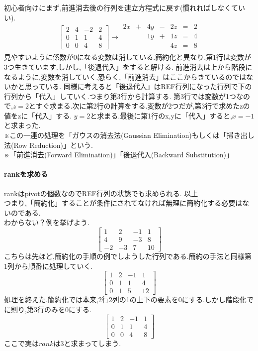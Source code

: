 初心者向けにまず,前進消去後の行列を連立方程式に戻す(慣れればしなくていい).
\[
\begin{bmatrix}
    2& 4 & -2 & 2 \\
    0 & 1 & 1 & 4 \\
    0 & 0 & 4 & 8
\end{bmatrix}
\rightarrow
\begin{array}{ccccccc}
    2x & + &4y & -&2z &= &2 \\
       &  &1y & +&1z &= &4 \\
       &  &   &  &4z &= &8 \\
\end{array}
\]
見やすいように係数が0になる変数は消している.簡約化と異なり,第1行は変数が3つ生きています.しかし,「後退代入」をすると解ける.
前進消去は上から階段になるように,変数を消していく.恐らく,「前進消去」はここからきているのではないかと思っている.
同様に考えると「後退代入」はREF行列になった行列で下の行列から「代入」していく.つまり第3行から計算する.
第3行では変数が1つなので,$z=2$とすぐ求まる.次に第2行の計算をする.変数が2つだが,第3行で求めたzの値をzに「代入」する.
$y=2$と求まる.最後に第1行のx,yに「代入」すると,$x=-1$と求まった.\\
※この一連の処理を「ガウスの消去法(Gaussian Elimination)もしくは「掃き出し法(Row Reduction)」という.\\
※「前進消去(Forward Elimination)」「後退代入(Backward Substitution)」
\newpage
\paragraph{rankを求める}
rankはpivotの個数なのでREF行列の状態でも求められる. 以上\\
つまり,「簡約化」することが条件にされてなければ無理に簡約化する必要はないのである.\\
わからない？例を挙げよう.
\[
\begin{bmatrix}
    1& 2 & -1 & 1 \\
    4 & 9 & -3 & 8 \\
    -2 & -3 & 7 & 10
\end{bmatrix}
\]
こちらは先ほど,簡約化の手順の例でしようした行列である.簡約の手法と同様第1列から順番に処理していく.
\[
\begin{bmatrix}
    1& 2 & -1 & 1 \\
    0 & 1 & 1 & 4 \\
    0 & 1 & 5 & 12
\end{bmatrix}
\]
処理を終えた.簡約化では本来,2行2列の1の上下の要素を0にする.しかし階段化でに則り,第3行のみを0にする.
\[
\begin{bmatrix}
    1& 2 & -1 & 1 \\
    0 & 1 & 1 & 4 \\
    0 & 0 & 4 & 8
\end{bmatrix}
\]
ここで実は$rank$は3と求まってしまう.

